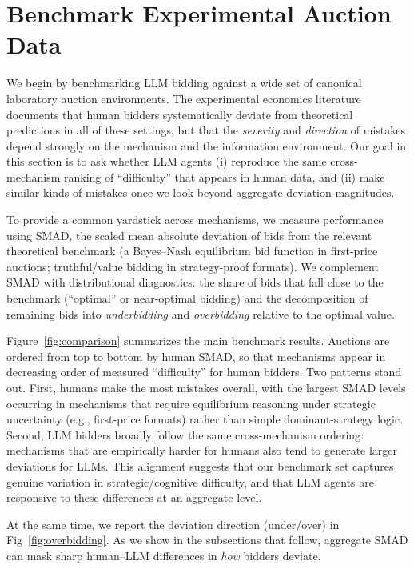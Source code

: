 \section{Benchmark Experimental Auction Data}\label{sec:benchmark_experimental}

We begin by benchmarking LLM bidding against a wide set of canonical laboratory auction environments. The experimental economics literature documents that human bidders systematically deviate from theoretical predictions in all of these settings, but that the \emph{severity} and \emph{direction} of mistakes depend strongly on the mechanism and the information environment. Our goal in this section is to ask whether LLM agents (i) reproduce the same cross-mechanism ranking of ``difficulty'' that appears in human data, and (ii) make similar kinds of mistakes once we look beyond aggregate deviation magnitudes.

To provide a common yardstick across mechanisms, we measure performance using SMAD, the scaled mean absolute deviation of bids from the relevant theoretical benchmark (a Bayes--Nash equilibrium bid function in first-price auctions; truthful/value bidding in strategy-proof formats). We complement SMAD with distributional diagnostics: the share of bids that fall close to the benchmark (``optimal'' or near-optimal bidding) and the decomposition of remaining bids into \emph{underbidding} and \emph{overbidding} relative to the optimal value.

Figure~\ref{fig:comparison} summarizes the main benchmark results. Auctions are ordered from top to bottom by human SMAD, so that mechanisms appear in decreasing order of measured ``difficulty'' for human bidders. Two patterns stand out. First, humans make the most mistakes overall, with the largest SMAD levels occurring in mechanisms that require equilibrium reasoning under strategic uncertainty (e.g., first-price formats) rather than simple dominant-strategy logic. Second, LLM bidders broadly follow the same cross-mechanism ordering: mechanisms that are empirically harder for humans also tend to generate larger deviations for LLMs. This alignment suggests that our benchmark set captures genuine variation in strategic/cognitive difficulty, and that LLM agents are responsive to these differences at an aggregate level.

At the same time, we report the deviation direction (under/over) in Fig~\ref{fig:overbidding}.
As we show in the subsections that follow, aggregate SMAD can mask sharp human--LLM differences in \emph{how} bidders deviate. 


